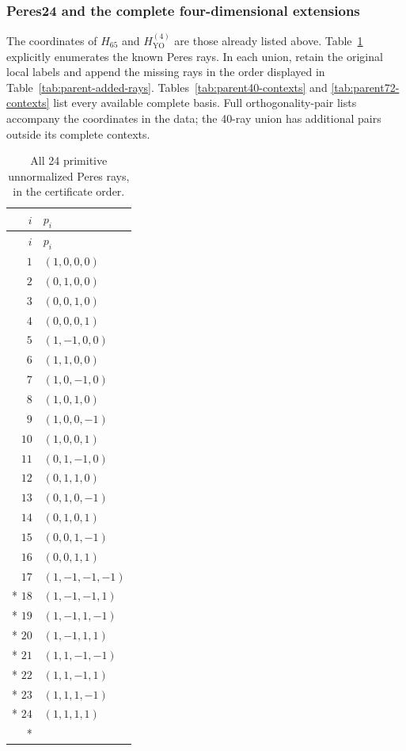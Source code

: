 \documentclass[aps,pra,reprint,superscriptaddress,longbibliography,nofootinbib,floatfix,10pt]{revtex4-2}
\theoremstyle{definition}
\newcommand{\YO}{\mathrm{YO}}
\begin{document}
\subsubsection{Peres24 and the complete four-dimensional extensions}
The coordinates of $H_{65}$ and $H_{\YO}^{(4)}$ are those already
listed above. Table~\ref{tab:peres-all} explicitly enumerates the known
Peres rays. In each union, retain the original local labels and append
the missing rays in the order displayed in
Table~\ref{tab:parent-added-rays}. Tables~\ref{tab:parent40-contexts}
and \ref{tab:parent72-contexts} list every available complete basis.
Full orthogonality-pair lists accompany the coordinates in the data;
the 40-ray union has additional pairs outside its complete contexts.
\begingroup\small
{}
\begin{longtable}{rl}
\caption{All 24 primitive unnormalized Peres rays, in the certificate order.}\label{tab:peres-all}\\
\toprule
$i$ & $p_i$\\\midrule
\endfirsthead
\toprule
$i$ & $p_i$\\\midrule
\endhead
\bottomrule\endfoot
$1$ & $(1,0,0,0)$\\
$2$ & $(0,1,0,0)$\\
$3$ & $(0,0,1,0)$\\
$4$ & $(0,0,0,1)$\\
$5$ & $(1,-1,0,0)$\\
$6$ & $(1,1,0,0)$\\
$7$ & $(1,0,-1,0)$\\
$8$ & $(1,0,1,0)$\\
$9$ & $(1,0,0,-1)$\\
$10$ & $(1,0,0,1)$\\
$11$ & $(0,1,-1,0)$\\
$12$ & $(0,1,1,0)$\\
$13$ & $(0,1,0,-1)$\\
$14$ & $(0,1,0,1)$\\
$15$ & $(0,0,1,-1)$\\
$16$ & $(0,0,1,1)$\\
$17$ & $(1,-1,-1,-1)$\\*
$18$ & $(1,-1,-1,1)$\\*
$19$ & $(1,-1,1,-1)$\\*
$20$ & $(1,-1,1,1)$\\*
$21$ & $(1,1,-1,-1)$\\*
$22$ & $(1,1,-1,1)$\\*
$23$ & $(1,1,1,-1)$\\*
$24$ & $(1,1,1,1)$\\*
\end{longtable}
\end{document}
